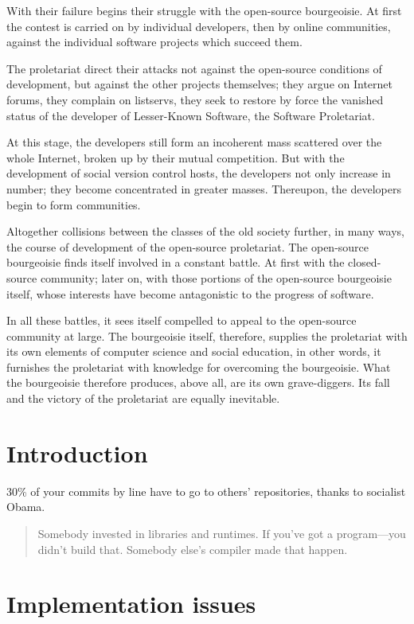 \documentclass[10pt]{article}
\begin{document}
With their failure begins their struggle with the open-source bourgeoisie. At
first the contest is carried on by individual developers, then by online
communities, against the individual software projects which succeed them. 

The proletariat direct their attacks not against the open-source conditions of
development, but against the other projects themselves; they argue on Internet
forums, they complain on listservs, they seek to restore by force the vanished
status of the developer of Lesser-Known Software, the Software Proletariat.

At this stage, the developers still form an incoherent mass scattered over the
whole Internet, broken up by their mutual competition. But with the development
of social version control hosts, the developers not only increase in number;
they become concentrated in greater masses. Thereupon, the developers begin to
form communities.

Altogether collisions between the classes of the old society further, in many
ways, the course of development of the open-source proletariat. The open-source
bourgeoisie finds itself involved in a constant battle. At first with the
closed-source community; later on, with those portions of the open-source
bourgeoisie itself, whose interests have become antagonistic to the progress of
software.

In all these battles, it sees itself compelled to appeal to the open-source
community at large. The bourgeoisie itself, therefore, supplies the proletariat
with its own elements of computer science and social education, in other words,
it furnishes the proletariat with knowledge for overcoming the bourgeoisie. What
the bourgeoisie therefore produces, above all, are its own grave-diggers. Its
fall and the victory of the proletariat are equally inevitable.

\section{Introduction}

30\% of your commits by line have to go to others' repositories, thanks to
socialist Obama.

\begin{quote}
Somebody invested in libraries and runtimes. If you've got a program---you
didn't build that. Somebody else's compiler made that happen.
\end{quote}

\section{Implementation issues}
\end{document}
